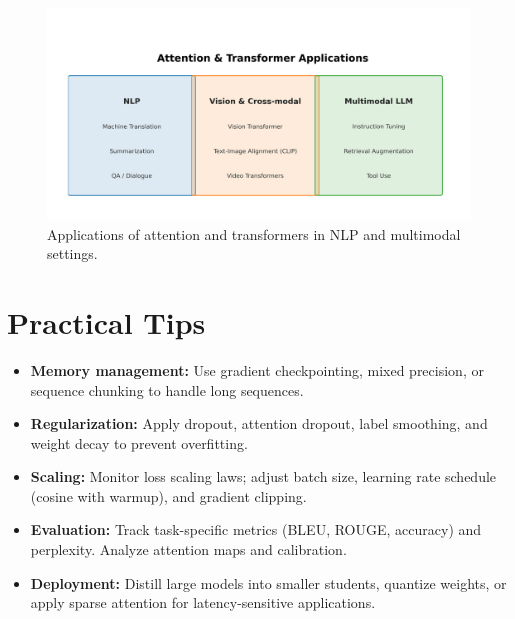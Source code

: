 ﻿\documentclass[12pt]{article}
\begin{document}
\begin{figure}[H]
  \centering
  \includegraphics[width=0.85\linewidth]{attention_transformer_applications.png}
  \caption{Applications of attention and transformers in NLP and multimodal settings.}
  \label{fig:transformer_applications}
\end{figure}
\FloatBarrier

\section{Practical Tips}
\begin{itemize}
  \item \textbf{Memory management:} Use gradient checkpointing, mixed precision, or sequence chunking to handle long sequences.\item \textbf{Regularization:} Apply dropout, attention dropout, label smoothing, and weight decay to prevent overfitting.\item \textbf{Scaling:} Monitor loss scaling laws; adjust batch size, learning rate schedule (cosine with warmup), and gradient clipping.\item \textbf{Evaluation:} Track task-specific metrics (BLEU, ROUGE, accuracy) and perplexity. Analyze attention maps and calibration.\item \textbf{Deployment:} Distill large models into smaller students, quantize weights, or apply sparse attention for latency-sensitive applications.\end{itemize}
\end{document}
